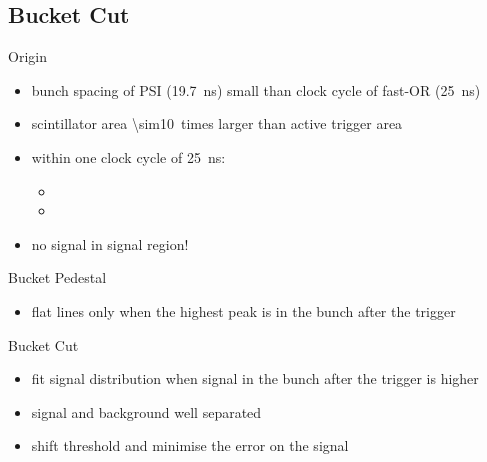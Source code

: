 \subsection{Bucket Cut}
\begin{frame}[noframenumbering]{Origin}

	
	\begin{itemize}\itemfill
		\item bunch spacing of PSI (\SI{19.7}{\nano\second}) small than clock cycle of fast-OR (\SI{25}{\nano\second})
		\item scintillator area \SI{\sim10}{times} larger than active trigger area
		\item within one clock cycle of \SI{25}{\nano\second}:
		\begin{itemize}
			\item {}
			\item {}
		\end{itemize}
		\item \ra no signal in signal region!
	\end{itemize}
	
\end{frame}
\begin{frame}{Bucket Pedestal}

	
	\begin{itemize}\itemfill
		\item flat lines only when the highest peak is in the bunch after the trigger
	\end{itemize}
		
\end{frame}
\begin{frame}{Bucket Cut}

	\vspace*{-15pt}
	
	\begin{itemize}\itemfill
		\item fit signal distribution when signal in the bunch after the trigger is higher
		\item signal and background well separated
		\item shift threshold and minimise the error on the signal
	\end{itemize}
		
\end{frame}%
